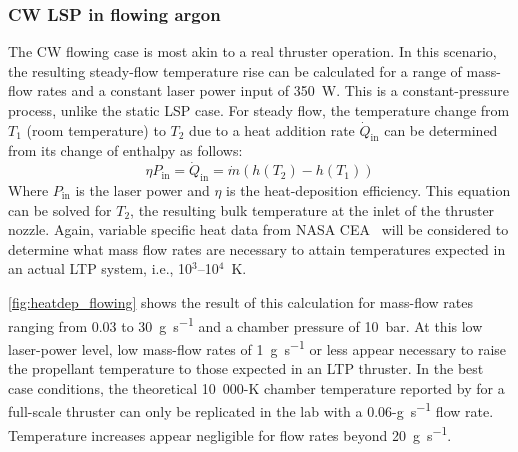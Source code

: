             \subsubsection*{CW LSP in flowing argon}
                The CW flowing case is most akin to a real thruster operation. In this scenario, the resulting steady-flow temperature rise can be calculated for a range of mass-flow rates and a constant laser power input of \qty{350}{W}. This is a constant-pressure process, unlike the static LSP case. For steady flow, the temperature change from $T_1$ (room temperature) to $T_2$ due to a heat addition rate $\dot{Q}_\mathrm{in}$ can be determined from its change of enthalpy as follows:
                \begin{equation}
                    \eta P_\mathrm{in} = \dot{Q}_\mathrm{in} = \dot{m}(h(T_2)-h(T_1))
                \end{equation}
                Where $P_\mathrm{in}$ is the laser power and $\eta$ is the heat-deposition efficiency. This equation can be solved for $T_2$, the resulting bulk temperature at the inlet of the thruster nozzle. Again, variable specific heat data from NASA CEA~\cite{gordonComputerProgramCalculation1994} will be considered to determine what mass flow rates are necessary to attain temperatures expected in an actual LTP system, i.e., 10$^3$--10$^4$~K.

                \autoref{fig:heatdep_flowing} shows the result of this calculation for mass-flow rates ranging from 0.03 to \qty{30}{g.s^{-1}} and a chamber pressure of \qty{10}{bar}. At this low laser-power level, low mass-flow rates of \qty{1}{g.s^{-1}} or less appear necessary to raise the propellant temperature to those expected in an LTP thruster. In the best case conditions, the theoretical 10~000-K chamber temperature reported by \textcite{duplayDesignRapidTransit2022} for a full-scale thruster can only be replicated in the lab with a 0.06-\unit{g.s^{-1}} flow rate. Temperature increases appear negligible for flow rates beyond \qty{20}{g.s^{-1}}.

